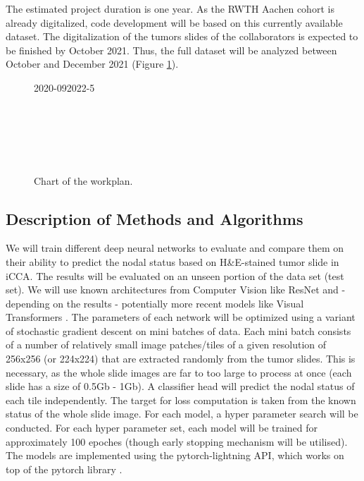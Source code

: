 \documentclass[12pt]{article}
\begin{document}
The estimated project duration is one year. As the RWTH Aachen cohort is already digitalized, code development will be based on this currently available dataset. The digitalization of the tumors slides of the collaborators is expected to be finished by October 2021. Thus, the full dataset will be analyzed between October and December 2021 (Figure \ref{fig:chart}).

\begin{figure}[htp]
\begin{ganttchart}[y unit title=0.6cm,
y unit chart=0.5cm,
hgrid,vgrid,
	time slot format=isodate-yearmonth,
	time slot unit=month,
	title height=.75, title top shift=0,
	bar height=0.6]{2020-09}{2022-5}
	 \\
	\\
	\\
	\\
	\\
	\\
\end{ganttchart}
\caption{Chart of the workplan.}
\label{fig:chart}
\end{figure}

\subsection{Description of Methods and Algorithms}
We will train different deep neural networks to evaluate and compare them on their ability to predict the nodal status based on H\&E-stained tumor slide in iCCA. The results will be evaluated on an unseen portion of the data set (test set). We will use known architectures from Computer Vision like ResNet and - depending on the results - potentially more recent models like Visual Transformers \cite{b23, b24}. The parameters of each network will be optimized using a variant of stochastic gradient descent on mini batches of data. Each mini batch consists of a number of relatively small image patches/tiles of a given resolution of 256x256 (or 224x224) that are extracted randomly from the tumor slides. This is necessary, as the whole slide images are far to too large to process at once (each slide has a size of 0.5Gb - 1Gb). A classifier head will predict the nodal status of each tile independently. The target for loss computation is taken from the known status of the whole slide image. For each model, a hyper parameter search will be conducted. For each hyper parameter set, each model will be trained for approximately 100 epoches (though early stopping mechanism will be utilised). The models are implemented using the pytorch-lightning API, which works on top of the pytorch library \cite{b25, b26}. 
\end{document}
